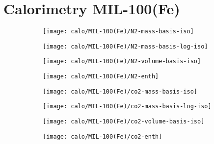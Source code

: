 
\section{Calorimetry MIL-100(Fe)}

\begin{figure}[H]
    \centering

    \begin{subfigure}{0.25\linewidth}
        \texttt{[image: calo/MIL-100(Fe)/N2-mass-basis-iso]}%
        \label{appx:fig:shaping:mil100n2mass}
    \end{subfigure}%
    \begin{subfigure}{0.25\linewidth}
        \texttt{[image: calo/MIL-100(Fe)/N2-mass-basis-log-iso]}%
        \label{appx:fig:shaping:mil100n2masslog}
    \end{subfigure}%
    \begin{subfigure}{0.25\linewidth}
        \texttt{[image: calo/MIL-100(Fe)/N2-volume-basis-iso]}%
        \label{appx:fig:shaping:mil100n2volume}
    \end{subfigure}%
    \begin{subfigure}{0.25\linewidth}
        \texttt{[image: calo/MIL-100(Fe)/N2-enth]}%
        \label{appx:fig:shaping:mil100n2enth}
    \end{subfigure}%
    
    \begin{subfigure}{0.25\textwidth}
        \texttt{[image: calo/MIL-100(Fe)/co2-mass-basis-iso]}%
        \label{appx:fig:shaping:mil100co2mass}
    \end{subfigure}%
    \begin{subfigure}{0.25\textwidth}
        \texttt{[image: calo/MIL-100(Fe)/co2-mass-basis-log-iso]}%
        \label{appx:fig:shaping:mil100co2masslog}
    \end{subfigure}%
    \begin{subfigure}{0.25\textwidth}
        \texttt{[image: calo/MIL-100(Fe)/co2-volume-basis-iso]}%
        \label{appx:fig:shaping:mil100co2volume}
    \end{subfigure}%
    \begin{subfigure}{0.25\textwidth}
        \texttt{[image: calo/MIL-100(Fe)/co2-enth]}%
        \label{appx:fig:shaping:mil100co2enth}
    \end{subfigure}%


\end{figure}
